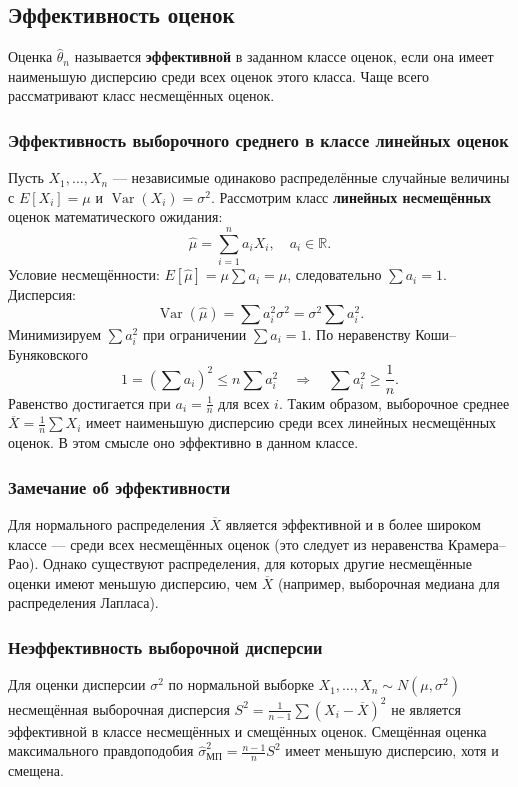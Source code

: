 \documentclass[10pt]{article}
\begin{document}
\subsection{Эффективность оценок}

\begin{definition}
Оценка $\hat{\theta}_n$ называется \textbf{эффективной} в заданном классе оценок, если она имеет наименьшую дисперсию среди всех оценок этого класса. Чаще всего рассматривают класс несмещённых оценок.
\end{definition}

\subsubsection*{Эффективность выборочного среднего в классе линейных оценок}
Пусть $X_1,\dots,X_n$ — независимые одинаково распределённые случайные величины с $E[X_i]=\mu$ и $\operatorname{Var}(X_i)=\sigma^2$. Рассмотрим класс \textbf{линейных несмещённых} оценок математического ожидания:
\[
\hat{\mu} = \sum_{i=1}^n a_i X_i, \quad a_i \in \mathbb{R}.
\]
Условие несмещённости: $E[\hat{\mu}] = \mu \sum a_i = \mu$, следовательно $\sum a_i = 1$. Дисперсия:
\[
\operatorname{Var}(\hat{\mu}) = \sum a_i^2 \sigma^2 = \sigma^2 \sum a_i^2.
\]
Минимизируем $\sum a_i^2$ при ограничении $\sum a_i = 1$. По неравенству Коши–Буняковского
\[
1 = \left(\sum a_i\right)^2 \le n \sum a_i^2 \quad \Rightarrow \quad \sum a_i^2 \ge \frac{1}{n}.
\]
Равенство достигается при $a_i = \frac{1}{n}$ для всех $i$. Таким образом, выборочное среднее $\overline{X} = \frac{1}{n}\sum X_i$ имеет наименьшую дисперсию среди всех линейных несмещённых оценок. В этом смысле оно эффективно в данном классе.

\subsubsection*{Замечание об эффективности}
Для нормального распределения $\overline{X}$ является эффективной и в более широком классе — среди всех несмещённых оценок (это следует из неравенства Крамера–Рао). Однако существуют распределения, для которых другие несмещённые оценки имеют меньшую дисперсию, чем $\overline{X}$ (например, выборочная медиана для распределения Лапласа).

\subsubsection*{Неэффективность выборочной дисперсии}
Для оценки дисперсии $\sigma^2$ по нормальной выборке $X_1,\dots,X_n \sim N(\mu,\sigma^2)$ несмещённая выборочная дисперсия $S^2 = \frac{1}{n-1}\sum (X_i-\overline{X})^2$ не является эффективной в классе несмещённых и смещённых оценок. Смещённая оценка максимального правдоподобия $\hat{\sigma}^2_{\text{МП}} = \frac{n-1}{n}S^2$ имеет меньшую дисперсию, хотя и смещена.
\end{document}
